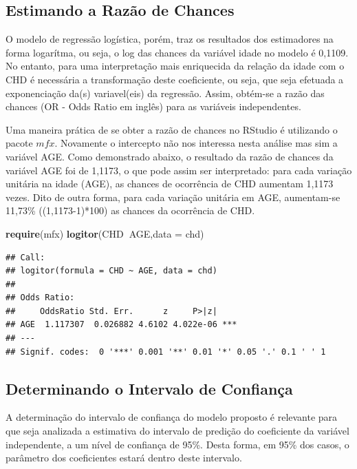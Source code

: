 \documentclass[12pt,brazil,]{book}
\newenvironment{Shaded}{\begin{snugshade}}{\end{snugshade}}
\newcommand{\DataTypeTok}[1]{\textcolor[rgb]{0.13,0.29,0.53}{#1}}
\newcommand{\KeywordTok}[1]{\textcolor[rgb]{0.13,0.29,0.53}{\textbf{#1}}}
\newcommand{\NormalTok}[1]{#1}
\newcommand{\OperatorTok}[1]{\textcolor[rgb]{0.81,0.36,0.00}{\textbf{#1}}}
\begin{document}
\hypertarget{estimando-a-razao-de-chances}{%
\subsection{Estimando a Razão de
Chances}\label{estimando-a-razao-de-chances}}

O modelo de regressão logística, porém, traz os resultados dos
estimadores na forma logarítma, ou seja, o log das chances da variável
idade no modelo é 0,1109. No entanto, para uma interpretação mais
enriquecida da relação da idade com o CHD é necessária a transformação
deste coeficiente, ou seja, que seja efetuada a exponenciação da(s)
variavel(eis) da regressão. Assim, obtém-se a razão das chances (OR -
Odds Ratio em inglês) para as variáveis independentes.

Uma maneira prática de se obter a razão de chances no RStudio é
utilizando o pacote \(mfx\). Novamente o intercepto não nos interessa
nesta análise mas sim a variável AGE. Como demonstrado abaixo, o
resultado da razão de chances da variável AGE foi de 1,1173, o que pode
assim ser interpretado: para cada variação unitária na idade (AGE), as
chances de ocorrência de CHD aumentam 1,1173 vezes. Dito de outra forma,
para cada variação unitária em AGE, aumentam-se 11,73\% ((1,1173-1)*100)
as chances da ocorrência de CHD.

\begin{Shaded}
\begin{Highlighting}[]
\KeywordTok{require}\NormalTok{(mfx)}
\KeywordTok{logitor}\NormalTok{(CHD}\OperatorTok{~}\NormalTok{AGE,}\DataTypeTok{data =}\NormalTok{ chd)}
\end{Highlighting}
\end{Shaded}

\begin{verbatim}
## Call:
## logitor(formula = CHD ~ AGE, data = chd)
## 
## Odds Ratio:
##     OddsRatio Std. Err.      z     P>|z|    
## AGE  1.117307  0.026882 4.6102 4.022e-06 ***
## ---
## Signif. codes:  0 '***' 0.001 '**' 0.01 '*' 0.05 '.' 0.1 ' ' 1
\end{verbatim}

\hypertarget{determinando-o-intervalo-de-confianca}{%
\subsection{Determinando o Intervalo de
Confiança}\label{determinando-o-intervalo-de-confianca}}

A determinação do intervalo de confiança do modelo proposto é relevante
para que seja analizada a estimativa do intervalo de predição do
coeficiente da variável independente, a um nível de confiança de 95\%.
Desta forma, em 95\% dos casos, o parâmetro dos coeficientes estará
dentro deste intervalo.
\end{document}
